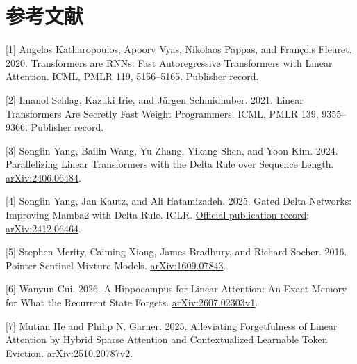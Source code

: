 \documentclass[11pt,a4paper]{article}
\begin{document}

\section{参考文献}\label{ux53c2ux8003ux6587ux732e}

\small\setlength{\parskip}{4pt}\setlength{\emergencystretch}{2em}


{[}1{]} Angelos Katharopoulos, Apoorv Vyas, Nikolaos Pappas, and François Fleuret. 2020. Transformers are RNNs: Fast Autoregressive Transformers with Linear Attention. ICML, PMLR 119, 5156--5165. \href{https://proceedings.mlr.press/v119/katharopoulos20a.html}{Publisher record}.


{[}2{]} Imanol Schlag, Kazuki Irie, and Jürgen Schmidhuber. 2021. Linear Transformers Are Secretly Fast Weight Programmers. ICML, PMLR 139, 9355--9366. \href{https://proceedings.mlr.press/v139/schlag21a.html}{Publisher record}.


{[}3{]} Songlin Yang, Bailin Wang, Yu Zhang, Yikang Shen, and Yoon Kim. 2024. Parallelizing Linear Transformers with the Delta Rule over Sequence Length. \href{https://arxiv.org/abs/2406.06484}{arXiv:2406.06484}.


{[}4{]} Songlin Yang, Jan Kautz, and Ali Hatamizadeh. 2025. Gated Delta Networks: Improving Mamba2 with Delta Rule. ICLR. \href{https://research.nvidia.com/labs/lpr/publication/yanggated2024/}{Official publication record}; \href{https://arxiv.org/abs/2412.06464}{arXiv:2412.06464}.


{[}5{]} Stephen Merity, Caiming Xiong, James Bradbury, and Richard Socher. 2016. Pointer Sentinel Mixture Models. \href{https://arxiv.org/abs/1609.07843}{arXiv:1609.07843}.


{[}6{]} Wanyun Cui. 2026. A Hippocampus for Linear Attention: An Exact Memory for What the Recurrent State Forgets. \href{https://arxiv.org/abs/2607.02303v1}{arXiv:2607.02303v1}.


{[}7{]} Mutian He and Philip N. Garner. 2025. Alleviating Forgetfulness of Linear Attention by Hybrid Sparse Attention and Contextualized Learnable Token Eviction. \href{https://arxiv.org/abs/2510.20787v2}{arXiv:2510.20787v2}.
\end{document}
